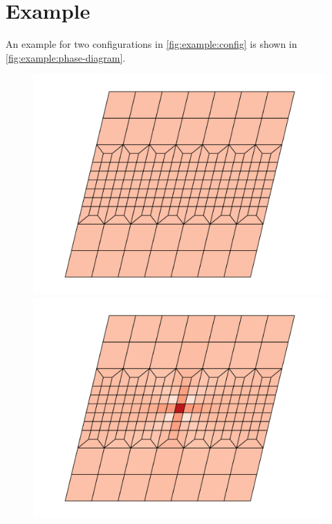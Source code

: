 \documentclass[fleqn]{goose-article}
\begin{document}
\clearpage

\section*{Example}

An example for two configurations in \cref{fig:example:config} is shown in
\cref{fig:example:phase-diagram}.

\begin{figure}[htp]
    \centering
    \captionsetup[subfigure]{justification=centering}
    \begin{minipage}[t]{.40\textwidth}
        \centering
        \includegraphics[width=\textwidth]{prestress_0_config.pdf}
    \end{minipage}
    \hspace{0.01\textwidth}
    \begin{minipage}[t]{.40\textwidth}
        \centering
        \includegraphics[width=\textwidth]{prestress_0_config-perturbed.pdf}

\end{minipage}
\end{figure}
\end{document}
